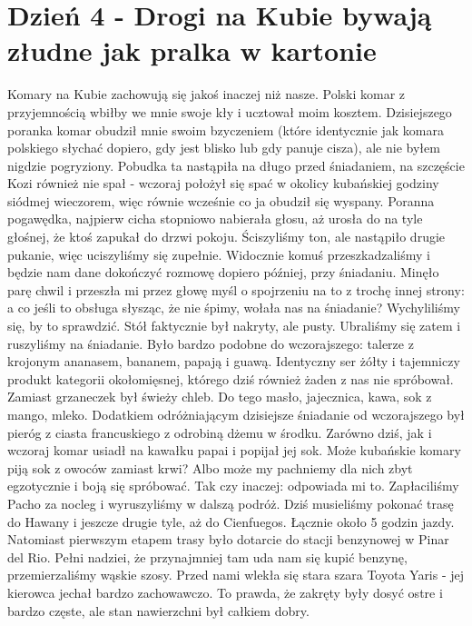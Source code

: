 
\chapter[Drogi na Kubie bywają złudne jak pralka w kartonie]{Dzień 4 - Drogi na Kubie bywają złudne jak pralka w kartonie}

Komary na Kubie zachowują się jakoś inaczej niż nasze.
Polski komar z przyjemnością wbiłby we mnie swoje kły i ucztował moim kosztem.
Dzisiejszego poranka komar obudził mnie swoim bzyczeniem (które identycznie jak komara polskiego słychać dopiero, gdy jest blisko lub gdy panuje cisza), ale nie byłem nigdzie pogryziony.
Pobudka ta nastąpiła na długo przed śniadaniem, na szczęście Kozi również nie spał - wczoraj położył się spać w okolicy kubańskiej godziny siódmej wieczorem, więc równie wcześnie co ja obudził się wyspany.
Poranna pogawędka, najpierw cicha stopniowo nabierała głosu, aż urosła do na tyle głośnej, że ktoś zapukał do drzwi pokoju.
Ściszyliśmy ton, ale nastąpiło drugie pukanie, więc uciszyliśmy się zupełnie.
Widocznie komuś przeszkadzaliśmy i będzie nam dane dokończyć rozmowę dopiero później, przy śniadaniu.
Minęło parę chwil i przeszła mi przez głowę myśl o spojrzeniu na to z trochę innej strony: a co jeśli to obsługa słysząc, że nie śpimy, wołała nas na śniadanie?
Wychyliliśmy się, by to sprawdzić.
Stół faktycznie był nakryty, ale pusty.
Ubraliśmy się zatem i ruszyliśmy na śniadanie.
Było bardzo podobne do wczorajszego: talerze z krojonym ananasem, bananem, papają i guawą.
Identyczny ser żółty i tajemniczy produkt kategorii okołomięsnej, którego dziś również żaden z nas nie spróbował.
Zamiast grzaneczek był świeży chleb.
Do tego masło, jajecznica, kawa, sok z mango, mleko.
Dodatkiem odróżniającym dzisiejsze śniadanie od wczorajszego był pieróg z ciasta francuskiego z odrobiną dżemu w środku.
Zarówno dziś, jak i wczoraj komar usiadł na kawałku papai i popijał jej sok.
Może kubańskie komary piją sok z owoców zamiast krwi?
Albo może my pachniemy dla nich zbyt egzotycznie i boją się spróbować.
Tak czy inaczej: odpowiada mi to.
Zapłaciliśmy Pacho za nocleg i wyruszyliśmy w dalszą podróż.
Dziś musieliśmy pokonać trasę do Hawany i jeszcze drugie tyle, aż do Cienfuegos.
Łącznie około 5 godzin jazdy.
Natomiast pierwszym etapem trasy było dotarcie do stacji benzynowej w Pinar del Rio.
Pełni nadziei, że przynajmniej tam uda nam się kupić benzynę, przemierzaliśmy wąskie szosy.
Przed nami wlekła się stara szara Toyota Yaris - jej kierowca jechał bardzo zachowawczo. 
To prawda, że zakręty były dosyć ostre i bardzo częste, ale stan nawierzchni był całkiem dobry.
